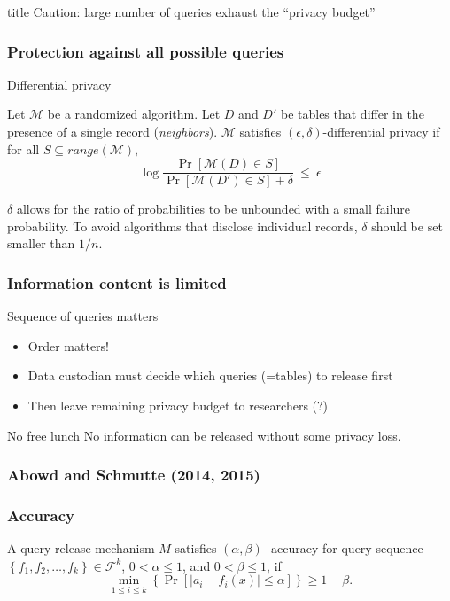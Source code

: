 \begin{frame}
	\begin{beamercolorbox}[sep=8pt,center]{title}
		 Caution: large number of queries exhaust the ``privacy budget''
	\end{beamercolorbox}
\end{frame}
\newcommand{\M}{\mathcal{M}}
\begin{frame}[fragile]
	\frametitle{Protection against all possible queries}
	\begin{block}{Differential privacy}

					Let $\M$ be a randomized algorithm. Let $D$ and $D'$ be tables that differ in the presence of a single record (\textit{neighbors}). $\M$ satisfies $(\epsilon, \delta)$-differential privacy if for all $S \subseteq range(\M)$,
$$
			\log \frac{\Pr[\M(D) \in S]}{\Pr[\M(D') \in S] + \delta} \ \le \ \epsilon
$$

		$\delta$ allows for the ratio of probabilities to be unbounded with a small failure probability. To avoid algorithms that disclose individual records, $\delta$ should be set smaller than $1/n$. 
	\end{block}
\end{frame}


\begin{frame}
	\frametitle{Information content is limited}
	\begin{block}{Sequence of queries matters}
		\begin{itemize}
		    \item Order matters!
			\item Data custodian must decide which queries (=tables) to release first
			\item Then leave remaining privacy budget to researchers (?)
		\end{itemize}
	\end{block}
	\begin{block}{No free lunch}
         No information can be released without some privacy loss.
	\end{block}
\end{frame}


\begin{frame}
	\frametitle{Abowd and Schmutte (2014, 2015)}
\frametitle{Accuracy}
\begin{definition}
	\label{def:acc} A query release mechanism $M$ satisfies $(\alpha ,\beta )$%
	-accuracy for query sequence $\left\{ f_{1},f_{2},\ldots ,f_{k}\right\} \in
	\mathcal{F}^{k}$, $0<\alpha \leq 1$, and $0<\beta \leq 1$, if
	$$\min_{1\leq i\leq k}\left\{ \Pr \left[ |a_{i}-f_{i}(x)|\leq \alpha \right] \right\} \geq
	1-\beta. $$%
\end{definition}
		\end{frame}

